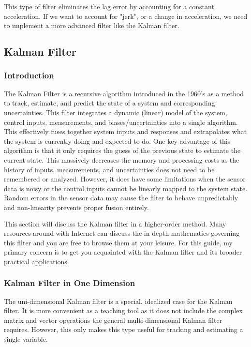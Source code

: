         This type of filter eliminates the lag error by accounting for a constant acceleration.
        If we want to account for "jerk", or a change in acceleration, we need to implement a more advanced filter like the Kalman filter.

        \subsection{Kalman Filter} 
        \subsubsection*{Introduction} 
        The Kalman Filter is a recursive algorithm introduced in the 1960's as a method to track, estimate, and predict the state of a system and corresponding uncertainties.
        This filter integrates a dynamic (linear) model of the system, control inputs, measurements, and biases/uncertainties into a single algorithm.
        This effectively fuses together system inputs and responses and extrapolates what the system is currently doing and expected to do.
        One key advantage of this algorithm is that it only requires the guess of the previous state to estimate the current state. 
        This massively decreases the memory and processing costs as the history of inputs, measurements, and uncertainties does not need to be remembered or analyzed.
        However, it does have some limitations when the sensor data is noisy or the control inputs cannot be linearly mapped to the system state.
        Random errors in the sensor data may cause the filter to behave unpredictably and non-linearity prevents proper fusion entirely.

        This section will discuss the Kalman filter in a higher-order method.
        Many resources around with Internet can discuss the in-depth mathematics governing this filter and you are free to browse them at your leisure. 
        For this guide, my primary concern is to get you acquainted with the Kalman filter and its broader practical applications.

        \subsubsection*{Kalman Filter in One Dimension}
        The uni-dimensional Kalman filter is a special, idealized case for the Kalman filter.
        It is more convenient as a teaching tool as it does not include the complex matrix and vector operations the general multi-dimensional Kalman filter requires.
        However, this only makes this type useful for tracking and estimating a single variable.

